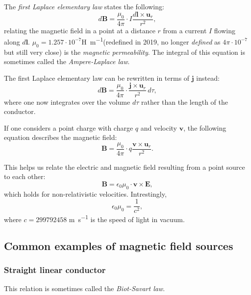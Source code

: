 \documentclass[a4paper, 12pt]{article}
\renewcommand{\vec}[1]{\mathbf{#1}}
\newcommand{\E}{\ensuremath{\vec{E}}}
\newcommand{\e}{\ensuremath{\epsilon_0}}
\renewcommand{\j}{\ensuremath{\vec{j}}}
\newcommand{\B}{\ensuremath{\vec{B}}}
\begin{document}
        The \textit{first Laplace elementary law} states the following:
        \begin{equation}
            d\B = \frac{\mu_0}{4\pi}\cdot I\frac{d\vec{l}\times\vec{u}_r}{r^2},
        \end{equation}
        relating the magnetic field in a point at a distance $r$ from a current $I$ flowing along $d\vec{l}$.
        $\mu_0 = 1.257\cdot 10^{-7}$\si{\henry\per\metre}(redefined in 2019, no longer \textit{defined} as $4\pi\cdot10^{-7}$ but still very close) is the \textit{magnetic permeability}. 
        The integral of this equation is sometimes called the \textit{Ampere-Laplace law}.

        The first Laplace elementary law can be rewritten in terms of \j{} instead:
        \begin{equation}
            d\B = \frac{\mu_0}{4\pi}\cdot \frac{\j\times\vec{u}_r}{r^2}\,d\tau,
        \end{equation}
        where one now integrates over the volume $d\tau$ rather than the length of the conductor.

        If one considers a point charge with charge $q$ and velocity $\vec{v}$, 
        the following equation describes the magnetic field:
        \begin{equation}
            \B = \frac{\mu_0}{4\pi}\cdot q\frac{\vec{v}\times\vec{u}_r}{r^2}.
        \end{equation}

        This helps us relate the electric and magnetic field resulting from a point source to each other:
        \begin{equation}
            \B = \e \mu_0 \cdot\vec{v}\times\E,
        \end{equation}
        which holds for non-relativistic velocities. Intrestingly,
        \begin{equation}
            \e\mu_0 = \frac{1}{c^2},
        \end{equation}
        where $c = 299792458$ \si{\metre\per\second} is the speed of light in vacuum. 

    \subsection{Common examples of magnetic field sources}
        \subsubsection{Straight linear conductor}
            This relation is sometimes called the \textit{Biot-Savart law}.
\end{document}
